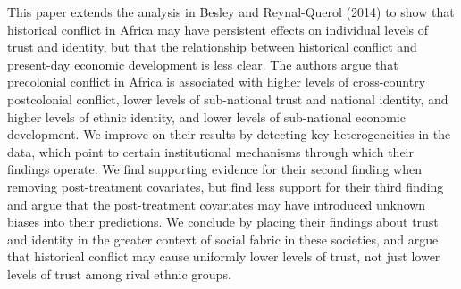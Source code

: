 This paper extends the analysis in Besley and Reynal-Querol (2014) to show that historical conflict in Africa may have persistent effects on individual levels of trust and identity, but that the relationship between historical conflict and present-day economic development is less clear. The authors argue that precolonial conflict in Africa is associated with higher levels of cross-country postcolonial conflict, lower levels of sub-national trust and national identity, and higher levels of ethnic identity, and lower levels of sub-national economic development. We improve on their results by detecting key heterogeneities in the data, which point to certain institutional mechanisms through which their findings operate. We find supporting evidence for their second finding when removing post-treatment covariates, but find less support for their third finding and argue that the post-treatment covariates may have introduced unknown biases into their predictions. We conclude by placing their findings about trust and identity in the greater context of social fabric in these societies, and argue that historical conflict may cause uniformly lower levels of trust, not just lower levels of trust among rival ethnic groups.
